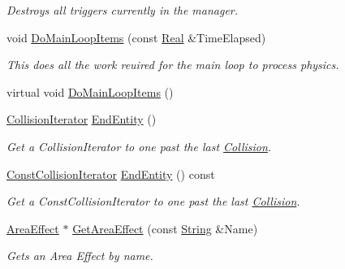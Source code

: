 \begin{DoxyCompactItemize}
\begin{DoxyCompactList}\small\item\em Destroys all triggers currently in the manager. \item\end{DoxyCompactList}\item 
void \hyperlink{classMezzanine_1_1PhysicsManager_a9fffb77acb0644d31ea78de4e823c0a0}{DoMainLoopItems} (const \hyperlink{namespaceMezzanine_a726731b1a7df72bf3583e4a97282c6f6}{Real} \&TimeElapsed)
\begin{DoxyCompactList}\small\item\em This does all the work reuired for the main loop to process physics. \item\end{DoxyCompactList}\item 
virtual void \hyperlink{classMezzanine_1_1PhysicsManager_a21df393f2356a20151fce997577e3d76}{DoMainLoopItems} ()
\item 
\hyperlink{classMezzanine_1_1PhysicsManager_a930a032df1bf01b9f93ba4e815a433c2}{CollisionIterator} \hyperlink{classMezzanine_1_1PhysicsManager_a5c5f6e44ee8cb787bddf4b813a642bea}{EndEntity} ()
\begin{DoxyCompactList}\small\item\em Get a CollisionIterator to one past the last \hyperlink{classMezzanine_1_1Collision}{Collision}. \item\end{DoxyCompactList}\item 
\hyperlink{classMezzanine_1_1PhysicsManager_a62c722b08b8fa0f015fe2b375c452dde}{ConstCollisionIterator} \hyperlink{classMezzanine_1_1PhysicsManager_aadf3425aa56497b63229a092cf0f798c}{EndEntity} () const 
\begin{DoxyCompactList}\small\item\em Get a ConstCollisionIterator to one past the last \hyperlink{classMezzanine_1_1Collision}{Collision}. \item\end{DoxyCompactList}\item 
\hyperlink{classMezzanine_1_1AreaEffect}{AreaEffect} $\ast$ \hyperlink{classMezzanine_1_1PhysicsManager_a820856e1a0bad25203b86d6e53391f13}{GetAreaEffect} (const \hyperlink{namespaceMezzanine_acf9fcc130e6ebf08e3d8491aebcf1c86}{String} \&Name)
\begin{DoxyCompactList}\small\item\em Gets an Area Effect by name. \item\end{DoxyCompactList}\item 

\end{DoxyCompactItemize}
